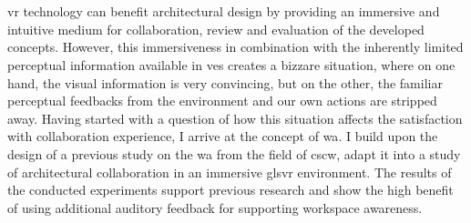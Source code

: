 \chapter{\abstractname}

\gls{vr} technology can benefit architectural design by providing an immersive and intuitive medium for collaboration, review and evaluation of the developed concepts. However, this immersiveness in combination with the inherently limited perceptual information available in \glspl{ve} creates a bizzare situation, where on one hand, the visual information is very convincing, but on the other, the familiar perceptual feedbacks from the environment and our own actions are stripped away.
Having started with a question of how this situation affects the satisfaction with collaboration experience, I arrive at the concept of \gls{wa}. I build upon the design of a previous study on the \gls{wa} from the field of \gls{cscw}, adapt it into a study of architectural collaboration in an immersive gls{vr} environment. 
The results of the conducted experiments support previous research and show the high benefit of using additional auditory feedback for supporting workspace awareness.


